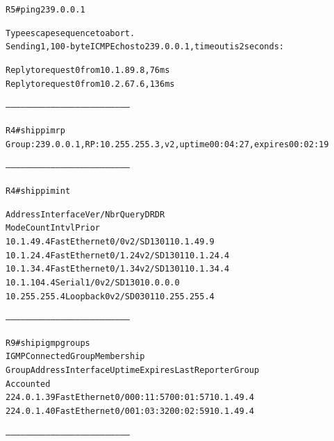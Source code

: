 \documentclass[12pt,twoside,a4paper]{report}
\begin{document}
\noindent
{\selectfont
\begin{small}
\begin{alltt}
R5#ping 239.0.0.1

Type escape sequence to abort.
Sending 1, 100-byte ICMP Echos to 239.0.0.1, timeout is 2 seconds:

Reply to request 0 from 10.1.89.8, 76 ms
Reply to request 0 from 10.2.67.6, 136 ms


---------------------------------------------------------------------------


R4#sh ip pim rp
Group: 239.0.0.1, RP: 10.255.255.3, v2, uptime 00:04:27, expires 00:02:19


---------------------------------------------------------------------------


R4#sh ip pim int

Address          Interface            Ver/   Nbr    Query  DR     DR
                                      Mode   Count  Intvl  Prior
10.1.49.4        FastEthernet0/0      v2/SD  1      30     1      10.1.49.9
10.1.24.4        FastEthernet0/1.24   v2/SD  1      30     1      10.1.24.4
10.1.34.4        FastEthernet0/1.34   v2/SD  1      30     1      10.1.34.4
10.1.104.4       Serial1/0            v2/SD  1      30     1      0.0.0.0
10.255.255.4     Loopback0            v2/SD  0      30     1      10.255.255.4


---------------------------------------------------------------------------


R9#sh ip igmp groups
IGMP Connected Group Membership
Group Address  Interface        Uptime    Expires   Last Reporter   Group
                                                                    Accounted
224.0.1.39     FastEthernet0/0  00:11:57  00:01:57  10.1.49.4
224.0.1.40     FastEthernet0/0  01:03:32  00:02:59  10.1.49.4


---------------------------------------------------------------------------

\end{alltt}
\end{small}
}
\end{document}
